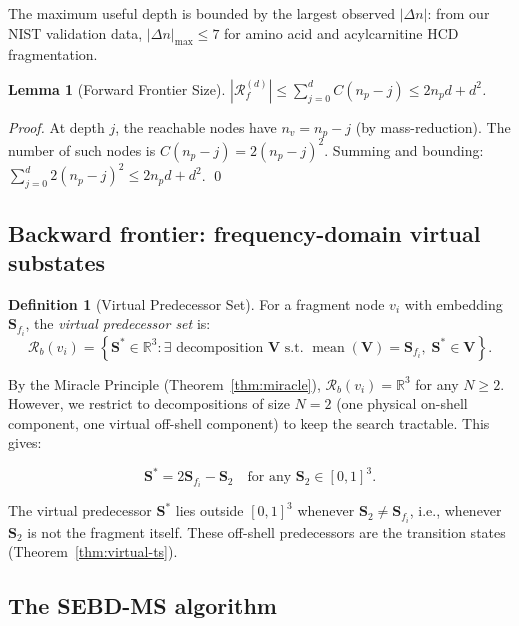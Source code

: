 \documentclass[twocolumn,10pt,a4paper]{article}
\theoremstyle{thmstyle}
\newtheorem{lemma}[theorem]{Lemma}
\theoremstyle{definition}
\newtheorem{definition}[theorem]{Definition}
\theoremstyle{remark}
\newcommand{\R}{\mathbb{R}}
\newcommand{\Sv}{\mathbf{S}}
\newcommand{\Reachf}{\mathcal{R}_f}
\newcommand{\Reachb}{\mathcal{R}_b}
\DeclareMathOperator{\mean}{mean}
\begin{document}
The maximum useful depth is bounded by the largest observed $|\Delta n|$:
from our NIST validation data, $|\Delta n|_\text{max} \leq 7$ for
amino acid and acylcarnitine HCD fragmentation.

\begin{lemma}[Forward Frontier Size]
\label{lem:forward-size}
$|\Reachf^{(d)}| \leq \sum_{j=0}^{d} C(n_p - j) \leq 2n_p d + d^2$.
\end{lemma}

\begin{proof}
At depth $j$, the reachable nodes have $n_v = n_p - j$ (by
mass-reduction). The number of such nodes is $C(n_p - j) = 2(n_p-j)^2$.
Summing and bounding: $\sum_{j=0}^{d} 2(n_p-j)^2 \leq 2n_p d + d^2$.
\qed
\end{proof}

\subsection{Backward frontier: frequency-domain virtual substates}

\begin{definition}[Virtual Predecessor Set]
\label{def:backward}
For a fragment node $v_i$ with embedding $\Sv_{f_i}$, the
\emph{virtual predecessor set} is:
\begin{equation}
\Reachb(v_i) = \left\{\Sv^* \in \R^3 :
\exists \text{ decomposition } \mathbf{V} \text{ s.t. }
\mean(\mathbf{V}) = \Sv_{f_i},\; \Sv^* \in \mathbf{V}\right\}.
\end{equation}
\end{definition}

By the Miracle Principle (Theorem~\ref{thm:miracle}), $\Reachb(v_i)
= \R^3$ for any $N \geq 2$. However, we restrict to decompositions
of size $N = 2$ (one physical on-shell component, one virtual off-shell
component) to keep the search tractable. This gives:

\begin{equation}
\Sv^* = 2\Sv_{f_i} - \Sv_2
\quad \text{for any } \Sv_2 \in [0,1]^3.
\label{eq:virtual-pred}
\end{equation}

The virtual predecessor $\Sv^*$ lies outside $[0,1]^3$ whenever
$\Sv_2 \neq \Sv_{f_i}$, i.e., whenever $\Sv_2$ is not the fragment
itself. These off-shell predecessors are the transition states
(Theorem~\ref{thm:virtual-ts}).

\subsection{The SEBD-MS algorithm}
\end{document}
